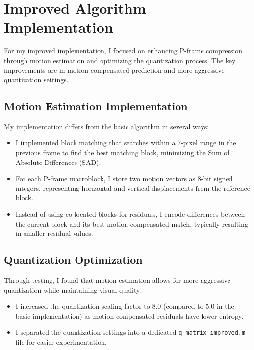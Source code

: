 \documentclass{article}
\begin{document}
\section{Improved Algorithm Implementation}
For my improved implementation, I focused on enhancing P-frame compression through motion estimation and optimizing the quantization process. The key improvements are in motion-compensated prediction and more aggressive quantization settings.

\subsection{Motion Estimation Implementation}
My implementation differs from the basic algorithm in several ways:

\begin{itemize}
    \item I implemented block matching that searches within a 7-pixel range in the previous frame to find the best matching block, minimizing the Sum of Absolute Differences (SAD).
    
    \item For each P-frame macroblock, I store two motion vectors as 8-bit signed integers, representing horizontal and vertical displacements from the reference block.
    
    \item Instead of using co-located blocks for residuals, I encode differences between the current block and its best motion-compensated match, typically resulting in smaller residual values.
\end{itemize}

\subsection{Quantization Optimization}
Through testing, I found that motion estimation allows for more aggressive quantization while maintaining visual quality:

\begin{itemize}
    \item I increased the quantization scaling factor to 8.0 (compared to 5.0 in the basic implementation) as motion-compensated residuals have lower entropy.
    \item I separated the quantization settings into a dedicated \texttt{q\_matrix\_improved.m} file for easier experimentation.
\end{itemize}
\end{document}
